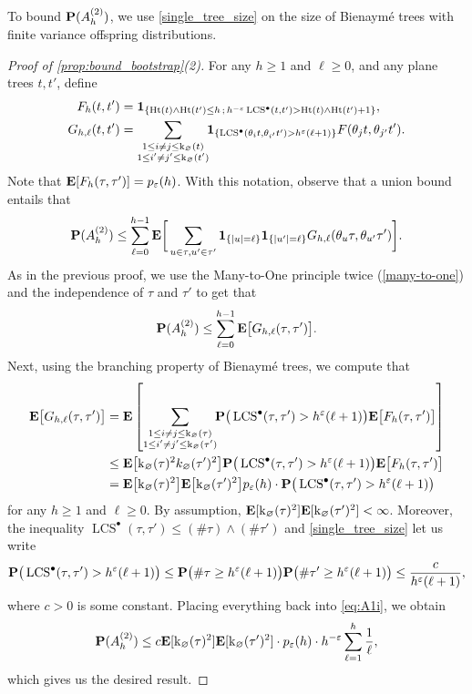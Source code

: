\documentclass[11pt,reqno]{amsart}
\newcommand{\Ht}{\mathrm{Ht}}
\newcommand{\rk}{\mathrm{k}}
\newcommand{\LCS}{\operatorname{LCS}}
\renewcommand{\emptyset}{\varnothing}
\begin{document}
To bound $\mathbf{P}(A_h^{(2)})$, we use \cref{single_tree_size} on the size of Bienaymé trees with finite variance offspring distributions.

\begin{proof}[Proof of \cref{prop:bound_bootstrap}(2)]
    For any $h\geq 1$ and $\ell\geq 0$, and any plane trees $t,t'$, define
    \begin{align*}
        F_{h}(t,t')&=\I{\Ht(t)\wedge \Ht(t')\leq h\, ;\, h^{-\varepsilon}\LCS^\bullet(t,t')> \Ht(t)\wedge\Ht(t')+1},\\
        G_{h,\ell}(t,t')&=\sum_{\substack{1 \leq i \ne j \leq \rk_\emptyset(t) \\ 1 \leq i' \ne j' \leq \rk_{\emptyset}(t')}}\!\! \I{\LCS^\bullet(\theta_{i} t,\theta_{i'}t')>h^\varepsilon(\ell+1)} F(\theta_j t,\theta_{j'}t').
    \end{align*}
    Note that ${\mathbf E}[F_h(\tau,\tau')]=p_\varepsilon(h)$. With this notation, observe that a union bound entails that
    \[\mathbf{P}(A_h^{(2)})\leq \sum_{\ell=0}^{h-1}{\mathbf E}\bigg[\sum_{u\in\tau,u'\in\tau'}{\mathbf 1}_{\left\{|u|=\ell\right\}}{\mathbf 1}_{\left\{|u'|=\ell\right\}}G_{h,\ell}(\theta_u\tau,\theta_{u'}\tau')\bigg].\]
    As in the previous proof, we use the Many-to-One principle twice (\cref{many-to-one}) and the independence of $\tau$ and $\tau'$ to get that
    \begin{equation}\label{eq:A1i}
    \mathbf{P}(A_h^{(2)}) \leq \sum_{\ell=0}^{h-1} {\mathbf E}\big[G_{h,\ell}(\tau,\tau')\big].
    \end{equation}
    Next, using the branching property of Bienaym\'{e} trees, we compute that
    \begin{align*}
     \E\big[G_{h,\ell}(\tau,\tau')\big]&= \ex\left[ \sum_{\substack{1 \leq i \ne j \leq \rk_\emptyset(\tau) \\ 1 \leq i' \ne j' \leq \rk_{\emptyset}(\tau')}}\!\! \prob\big(\LCS^\bullet(\tau,\tau')>h^\varepsilon(\ell+1)\big)\E\big[F_h(\tau,\tau')\big]\right]\\
    &\leq \E\big[ \rk_\emptyset(\tau)^2k_\emptyset(\tau')^2\big] \prob\big(\LCS^\bullet(\tau,\tau')>h^\varepsilon(\ell+1)\big)\E\big[F_h(\tau,\tau')\big]\\
    &= \E\big[\rk_\emptyset(\tau)^2\big]\E\big[\rk_\emptyset(\tau')^2\big] p_\varepsilon(h)\cdot \prob\big(\LCS^\bullet(\tau,\tau')>h^\varepsilon(\ell+1)\big)
    \end{align*}
    for any $h\geq 1$ and $\ell\geq 0$. By assumption, $\ex[\rk_\emptyset(\tau)^2] \ex[\rk_\emptyset(\tau')^2] < \infty$. Moreover, the inequality $\LCS^\bullet(\tau,\tau') \leq (\# \tau) \wedge (\# \tau')$ and \cref{single_tree_size} let us write 
    \[\prob\big(\LCS^\bullet(\tau,\tau')>h^\varepsilon(\ell+1)\big)\leq \prob\big(\# \tau \geq h^\varepsilon (\ell+1)\big)\prob\big(\# \tau' \geq h^\varepsilon (\ell+1)\big) \leq \frac{c}{h^\varepsilon (\ell+1)},\]
    where $c>0$ is some constant. Placing everything back into \eqref{eq:A1i}, we obtain
    \[\prob(A_h^{(2)}) \leq c\ex[\rk_\emptyset(\tau)^2]\ex[\rk_\emptyset(\tau')^2]\cdot p_\varepsilon(h)\cdot h^{-\varepsilon}\sum_{\ell=1}^{h}  \frac{1}{\ell},\]
    which gives us the desired result.
\end{proof}
\end{document}
